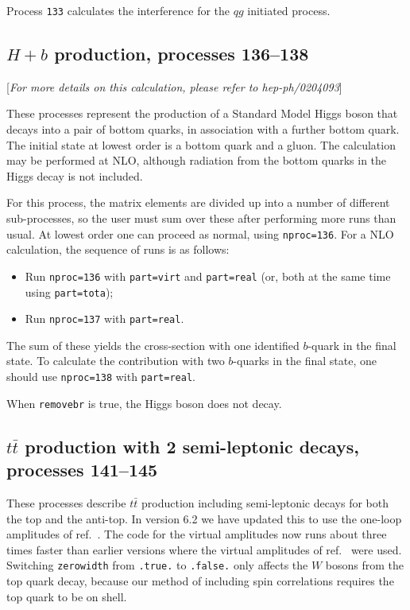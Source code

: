 \documentclass[12pt]{article}
\begin{document}
Process {\tt 133} calculates the interference for the $qg$ initiated process.
\subsection{$H+b$ production, processes 136--138}
\label{subsec:Hb}

\begin{center}
[{\it For more details on this calculation, please refer to hep-ph/0204093}]
\end{center}

These processes represent the production of a Standard Model Higgs
boson that decays into a pair of bottom quarks,
in association with a further bottom quark. The initial state at lowest order
is a bottom quark and a gluon.
The calculation may be performed at NLO, although radiation from the
bottom quarks in the Higgs decay is not included.

For this process, the matrix elements are divided up into a number of
different sub-processes, so the user must sum over these after performing
more runs than usual. At lowest order one can proceed as normal, using
{\tt nproc=136}. For a NLO calculation, the sequence of runs is as follows:
\begin{itemize}
\item Run {\tt nproc=136} with {\tt part=virt} and {\tt part=real} (or, both
at the same time using {\tt part=tota});
\item Run {\tt nproc=137} with {\tt part=real}.
\end{itemize}
The sum of these yields the cross-section with one identified $b$-quark in
the final state. To calculate the contribution with two $b$-quarks in the
final state, one should use {\tt nproc=138} with {\tt part=real}.

When {\tt removebr} is true, the Higgs boson does not decay.

\subsection{$t\bar{t}$ production with 2 semi-leptonic decays, processes 141--145}
\label{subsec:ttbar}

These processes describe $t \bar{t}$ production including semi-leptonic
decays for both the top and the anti-top. 
In version 6.2 we have updated this to use the one-loop amplitudes of
ref.~\cite{Badger:2011yu}. The code for the virtual amplitudes now runs
about three times faster than earlier versions where the virtual
amplitudes of ref.~\cite{Korner:2002hy} were used.  
Switching {\tt zerowidth} from {\tt .true.} to {\tt .false.} only affects 
the $W$ bosons from the top quark decay, because our method of including spin
correlations requires the top quark to be on shell.
\end{document}
